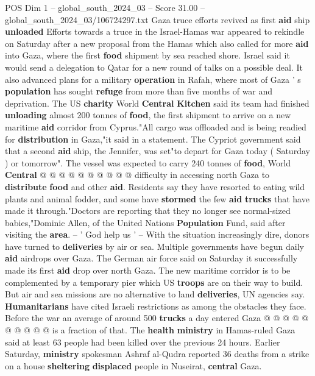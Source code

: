 \begin{textsample}{POS Dim 1 – global\_south\_2024\_03 – Score 31.00 – global\_south\_2024\_03/106724297.txt}  \label{ex:f1_pos_015}
Gaza truce efforts revived as first \textbf{aid} ship \textbf{unloaded} Efforts towards a truce in the Israel-Hamas war appeared to rekindle on Saturday after a new proposal from the Hamas which also called for more \textbf{aid} into Gaza, where the first \textbf{food} shipment by sea reached shore.
Israel said it would send a delegation to Qatar for a new round of talks on a possible deal.
It also advanced plans for a military \textbf{operation} in Rafah, where most of Gaza ' s \textbf{population} has sought \textbf{refuge} from more than five months of war and deprivation.
The US \textbf{charity} World \textbf{Central} \textbf{Kitchen} said its team had finished \textbf{unloading} almost 200 tonnes of \textbf{food}, the first shipment to arrive on a new maritime \textbf{aid} corridor from Cyprus."All cargo was offloaded and is being readied for \textbf{distribution} in Gaza,"it said in a statement.
The Cypriot government said that a second \textbf{aid} ship, the Jennifer, was set"to depart for Gaza today ( Saturday ) or tomorrow".
The vessel was expected to carry 240 tonnes of \textbf{food}, World \textbf{Central} @ @ @ @ @ @ @ @ @ @ difficulty in accessing north Gaza to \textbf{distribute} \textbf{food} and other \textbf{aid}.
Residents say they have resorted to eating wild plants and animal fodder, and some have \textbf{stormed} the few \textbf{aid} \textbf{trucks} that have made it through."Doctors are reporting that they no longer see normal-sized babies,"Dominic Allen, of the United Nations \textbf{Population} Fund, said after visiting the \textbf{area}. -- ' God help us ' -- With the situation increasingly dire, donors have turned to \textbf{deliveries} by air or sea.
Multiple governments have begun daily \textbf{aid} airdrops over Gaza.
The German air force said on Saturday it successfully made its first \textbf{aid} drop over north Gaza.
The new maritime corridor is to be complemented by a temporary pier which US \textbf{troops} are on their way to build.
But air and sea missions are no alternative to land \textbf{deliveries}, UN agencies say. \textbf{Humanitarians} have cited Israeli restrictions as among the obstacles they face.
Before the war an average of around 500 \textbf{trucks} a day entered Gaza @ @ @ @ @ @ @ @ @ @ is a fraction of that.
The \textbf{health} \textbf{ministry} in Hamas-ruled Gaza said at least 63 people had been killed over the previous 24 hours.
Earlier Saturday, \textbf{ministry} spokesman Ashraf al-Qudra reported 36 deaths from a strike on a house \textbf{sheltering} \textbf{displaced} people in Nuseirat, \textbf{central} Gaza.

\end{textsample}

